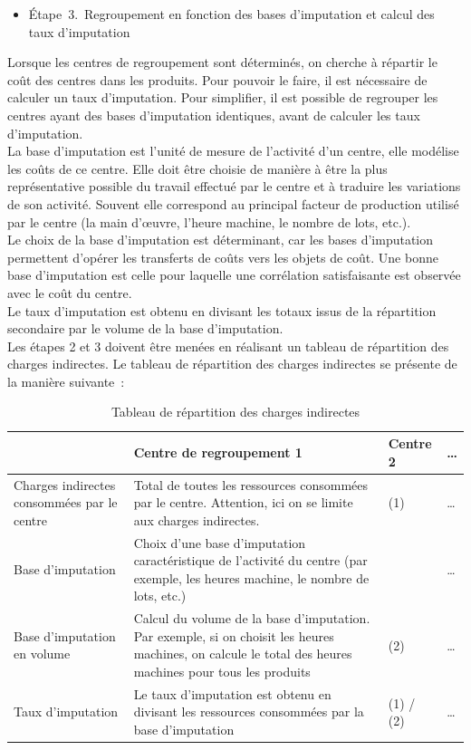 \documentclass{tufte-handout}
\begin{document}
\begin{enumerate}
\begin{itemize}
\item Étape 3. Regroupement en fonction des bases d’imputation et calcul des taux d’imputation\\
\end{itemize}
Lorsque les centres de regroupement sont déterminés, on cherche à répartir le coût des centres dans les produits. Pour pouvoir le faire, il est nécessaire de calculer un taux d'imputation. Pour simplifier, il est possible de regrouper les centres ayant des bases d'imputation identiques, avant de calculer les taux d'imputation.\\
La base d'imputation est l'unité de mesure de l'activité d'un centre, elle modélise les coûts de ce centre. Elle doit être choisie de manière à être la plus représentative possible du travail effectué par le centre et à traduire les variations de son activité. Souvent elle correspond au principal facteur de production utilisé par le centre (la main d'œuvre, l'heure machine, le nombre de lots, etc.).\\
Le choix de la base d'imputation est déterminant, car les bases d'imputation permettent d'opérer les transferts de coûts vers les objets de coût. Une bonne base d'imputation est celle pour laquelle une corrélation satisfaisante est observée avec le coût du centre.\\
Le taux d'imputation est obtenu en divisant les totaux issus de la répartition secondaire par le volume de la base d'imputation.\\
Les étapes 2 et 3 doivent être menées en réalisant un tableau de répartition des charges indirectes. Le tableau de répartition des charges indirectes se présente de la manière suivante :\\
\begin{table}[htbp]
\caption{Tableau de répartition des charges indirectes}
\centering
\begin{tabular}{llll}
 & Centre de regroupement 1 & Centre 2 & \ldots{}\\
\hline
Charges indirectes consommées par le centre & Total de toutes les ressources consommées par le centre. Attention, ici on se limite aux charges indirectes. & (1) & \ldots{}\\
Base d'imputation & Choix d'une base d'imputation caractéristique de l'activité du centre (par exemple, les heures machine, le nombre de lots, etc.) &  & \ldots{}\\
Base d'imputation en volume & Calcul du volume de la base d'imputation. Par exemple, si on choisit les heures machines, on calcule le total des heures machines pour tous les produits & (2) & \ldots{}\\
Taux d'imputation & Le taux d'imputation est obtenu en divisant les ressources consommées par la base d'imputation & (1) / (2) & \ldots{}\\
\end{tabular}
\end{table}


\end{enumerate}
\end{document}
